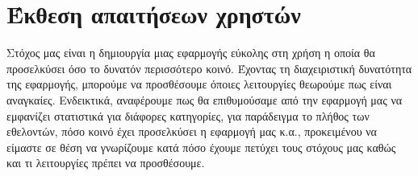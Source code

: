 \section{Έκθεση απαιτήσεων χρηστών}

Στόχος μας είναι η δημιουργία μιας εφαρμογής εύκολης στη χρήση η οποία θα προσελκύσει όσο το δυνατόν περισσότερο κοινό. Έχοντας τη διαχειριστική δυνατότητα της εφαρμογής, μπορούμε να προσθέσουμε όποιες λειτουργίες θεωρούμε πως είναι αναγκαίες. Ενδεικτικά, αναφέρουμε πως θα επιθυμούσαμε από την εφαρμογή μας να εμφανίζει στατιστικά για διάφορες κατηγορίες, για παράδειγμα το πλήθος των εθελοντών, πόσο κοινό έχει προσελκύσει η εφαρμογή μας κ.α., προκειμένου να είμαστε σε θέση να γνωρίζουμε κατά πόσο έχουμε πετύχει τους στόχους μας καθώς και τι λειτουργίες πρέπει να προσθέσουμε.
